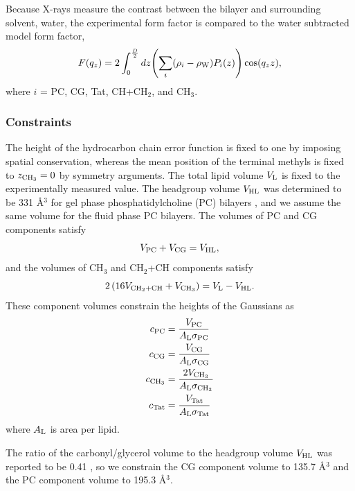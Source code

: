 Because X-rays measure the contrast between the bilayer and surrounding solvent, 
water, the experimental form factor is compared to the water subtracted model
form factor,
\begin{equation}
  F(q_z) = 2\int_0^{\frac{D}{2}} \mathop{dz} \mathopen{}\left( 
    \sum_i(\rho_i-\rho_\textrm{W})P_i(z)
   \right)\mathclose{} \cos(q_zz),
\end{equation}
where $i$ = PC, CG, Tat, CH+CH$_2$, and CH$_3$.

\subsubsection{Constraints}
The height of the hydrocarbon chain error function is fixed to one by imposing
spatial conservation, whereas the mean position of the terminal methyls is
fixed to $z_{\textrm{CH}_3}=0$ by symmetry arguments. The total lipid volume
$V_\textrm{L}$ is fixed to the experimentally measured value. 
The headgroup volume $V_\textrm{HL}$ was determined to be 331 \AA$^3$ for 
gel phase phosphatidylcholine (PC) bilayers \cite{Tristram-Nagle02},
and we assume the same volume for the fluid phase PC bilayers.
The volumes of PC and CG components satisfy
\begin{equation}
  V_\textrm{PC} + V_\textrm{CG} = V_\textrm{HL},
\end{equation}
and the volumes of CH$_3$ and CH$_2$+CH components satisfy
\begin{equation}
  2\left(16V_{\textrm{CH}_2+\textrm{CH}} + V_{\textrm{CH}_3}\right) = V_\textrm{L}-V_\textrm{HL}.
\end{equation}
These component volumes constrain the heights of the Gaussians as
\begin{align}
  c_\textrm{PC} &= \frac{V_\textrm{PC}}{A_\textrm{L}\sigma_\textrm{PC}} \\
  c_\textrm{CG} &= \frac{V_\textrm{CG}}{A_\textrm{L}\sigma_\textrm{CG}} \\
  c_{\textrm{CH}_3} &= \frac{2V_{\textrm{CH}_3}}{A_\textrm{L}\sigma_{\textrm{CH}_3}} \\
  c_\textrm{Tat} &= \frac{V_\textrm{Tat}}{A_\textrm{L}\sigma_\textrm{Tat}}
\end{align}
where $A_\textrm{L}$ is area per lipid.

The ratio of 
the carbonyl/glycerol volume to the headgroup volume $V_\textrm{HL}$ was
reported to be 0.41 \cite{Braun13}, so we constrain the CG
component volume to 135.7 \AA$^3$ and the PC component volume to 
195.3 \AA$^3$. 

